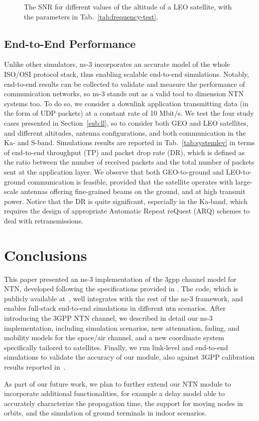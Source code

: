 \begin{figure}[t]
    \centering 
    \setlength{}
    \setlength{}
    
    \caption{The SNR for different values of the altitude of a LEO satellite, with the parameters in Tab.~\ref{tab:frequency-test}.}
    \label{fig:altitude-test}
\end{figure}

\subsection{End-to-End Performance}
Unlike other simulators, ns-3 incorporates an accurate model of the whole ISO/OSI protocol stack, thus enabling scalable end-to-end simulations. Notably, end-to-end results can be collected to validate and measure the performance of communication networks, so ns-3 stands out as a valid tool to dimension NTN systems too.
To do so, we consider a downlink application transmitting data (in the form of UDP packets) at a constant rate of 10 Mbit/s. We test the four study cases presented in Section~\ref{sub:ll}, so to consider both GEO and LEO satellites, and different altitudes, antenna configurations, and both communication in the Ka- and S-band. 
Simulations results are reported in Tab.~\ref{tab:systemlev} in terms of end-to-end throughput (TP) and packet drop rate (DR), which is defined as the ratio between the number of received packets and the total number of packets sent at the application layer.
We observe that both GEO-to-ground and LEO-to-ground communication is feasible, provided that the satellite operates with large-scale antennas offering fine-grained beams on the ground, and at high transmit power. 
Notice that the DR is quite significant, especially in the Ka-band, which requires the design of appropriate Automatic Repeat reQuest (ARQ) schemes to deal with retransmissions.


\section{Conclusions}
\label{sec:conclusions}
This paper presented an ns-3 implementation of the \gls{3gpp} channel model for NTN, developed following the specifications provided in \cite{38811}.
The code, which is publicly available at~\cite{ntngitlab}, well integrates with the rest of the ns-3 framework, and enables full-stack end-to-end simulations in different \gls{ntn} scenarios. After introducing the 3GPP NTN channel, we described in detail our ns-3 implementation, including simulation scenarios, new attenuation, fading, and mobility models for the space/air channel, and a new coordinate system specifically tailored to satellites. Finally, we run link-level and end-to-end simulations to validate the accuracy of our module, also against 3GPP calibration results reported in~\cite{38821}.

As part of our future work, we plan to further extend our NTN module to incorporate additional functionalities, for example a delay model able to accurately characterize the propagation time, the support for moving nodes in orbits, and the simulation of ground terminals in indoor scenarios.
